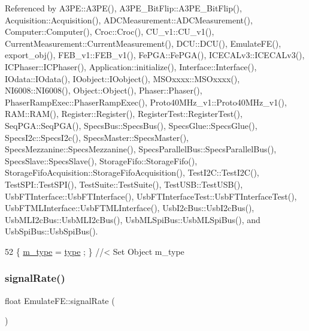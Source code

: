Referenced by A3\+P\+E\+::\+A3\+P\+E(), A3\+P\+E\+\_\+\+Bit\+Flip\+::\+A3\+P\+E\+\_\+\+Bit\+Flip(), Acquisition\+::\+Acquisition(), A\+D\+C\+Measurement\+::\+A\+D\+C\+Measurement(), Computer\+::\+Computer(), Croc\+::\+Croc(), C\+U\+\_\+v1\+::\+C\+U\+\_\+v1(), Current\+Measurement\+::\+Current\+Measurement(), D\+C\+U\+::\+D\+C\+U(), Emulate\+F\+E(), export\+\_\+obj(), F\+E\+B\+\_\+v1\+::\+F\+E\+B\+\_\+v1(), Fe\+P\+G\+A\+::\+Fe\+P\+G\+A(), I\+C\+E\+C\+A\+Lv3\+::\+I\+C\+E\+C\+A\+Lv3(), I\+C\+Phaser\+::\+I\+C\+Phaser(), Application\+::initialize(), Interface\+::\+Interface(), I\+Odata\+::\+I\+Odata(), I\+Oobject\+::\+I\+Oobject(), M\+S\+Oxxxx\+::\+M\+S\+Oxxxx(), N\+I6008\+::\+N\+I6008(), Object\+::\+Object(), Phaser\+::\+Phaser(), Phaser\+Ramp\+Exec\+::\+Phaser\+Ramp\+Exec(), Proto40\+M\+Hz\+\_\+v1\+::\+Proto40\+M\+Hz\+\_\+v1(), R\+A\+M\+::\+R\+A\+M(), Register\+::\+Register(), Register\+Test\+::\+Register\+Test(), Seq\+P\+G\+A\+::\+Seq\+P\+G\+A(), Specs\+Bus\+::\+Specs\+Bus(), Specs\+Glue\+::\+Specs\+Glue(), Specs\+I2c\+::\+Specs\+I2c(), Specs\+Master\+::\+Specs\+Master(), Specs\+Mezzanine\+::\+Specs\+Mezzanine(), Specs\+Parallel\+Bus\+::\+Specs\+Parallel\+Bus(), Specs\+Slave\+::\+Specs\+Slave(), Storage\+Fifo\+::\+Storage\+Fifo(), Storage\+Fifo\+Acquisition\+::\+Storage\+Fifo\+Acquisition(), Test\+I2\+C\+::\+Test\+I2\+C(), Test\+S\+P\+I\+::\+Test\+S\+P\+I(), Test\+Suite\+::\+Test\+Suite(), Test\+U\+S\+B\+::\+Test\+U\+S\+B(), Usb\+F\+T\+Interface\+::\+Usb\+F\+T\+Interface(), Usb\+F\+T\+Interface\+Test\+::\+Usb\+F\+T\+Interface\+Test(), Usb\+F\+T\+M\+L\+Interface\+::\+Usb\+F\+T\+M\+L\+Interface(), Usb\+I2c\+Bus\+::\+Usb\+I2c\+Bus(), Usb\+M\+L\+I2c\+Bus\+::\+Usb\+M\+L\+I2c\+Bus(), Usb\+M\+L\+Spi\+Bus\+::\+Usb\+M\+L\+Spi\+Bus(), and Usb\+Spi\+Bus\+::\+Usb\+Spi\+Bus().


\begin{DoxyCode}
52 \{ \hyperlink{classObject_a457a600fe8c00eb1034374f75110a78c}{m\_type}  = \hyperlink{classObject_a84f99f70f144a83e1582d1d0f84e4e62}{type}  ; \} \textcolor{comment}{//< Set Object m\_type}
\end{DoxyCode}
\mbox{\label{classEmulateFE_a98d2e402e4707109ca14ee9f4d95c2fa}} 
\subsubsection{\texorpdfstring{signal\+Rate()}{signalRate()}}
{\footnotesize\ttfamily float Emulate\+F\+E\+::signal\+Rate (\begin{DoxyParamCaption}{ }\end{DoxyParamCaption})\hspace{0.3cm}{\ttfamily [inline]}}



